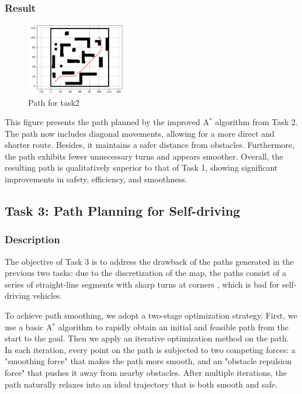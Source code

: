 \documentclass[aps,letterpaper,10pt]{revtex4}
\begin{document}
\subsubsection{Result}
\begin{figure}[h!]
    \centering %
    \includegraphics[width=0.4\textwidth]{task2.png} %
    \caption{Path for task2} %
    \label{fig:logo} %
\end{figure}
This figure presents the path planned by the improved A$^*$ algorithm from Task 2. The path now includes diagonal movements, allowing for a more direct and shorter route. Besides, it maintains a safer distance from obstacles. Furthermore, the path exhibits fewer unnecessary turns and appears smoother. Overall, the resulting path is qualitatively superior to that of Task 1, showing significant improvements in safety, efficiency, and smoothness.

\newpage
\subsection{Task 3: Path Planning for Self-driving}
\subsubsection{Description}
The objective of Task 3 is to address the  drawback of the paths generated in the previous two tasks: due to the discretization of the map, the paths consist of a series of straight-line segments with sharp turns at corners , which is bad for self-driving vehicles.

To achieve path smoothing, we adopt a two-stage optimization strategy. First, we use a basic A$^*$ algorithm to rapidly obtain an initial and feasible path from the start to the goal. Then we apply an iterative optimization method on the path.  In each iteration, every point on the path is subjected to two competing forces: a "smoothing force" that makes the path more smooth, and an "obstacle repulsion force" that pushes it away from nearby obstacles. After multiple iterations, the path naturally relaxes into an ideal trajectory that is both smooth and safe.
\end{document}
